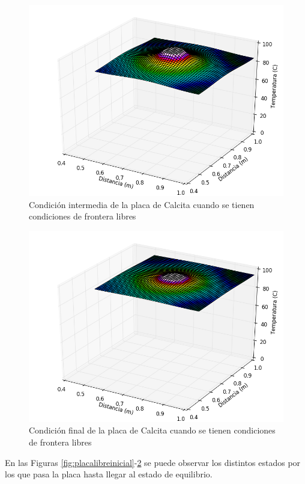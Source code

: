 \documentclass[]{article}
\begin{document}
\begin{figure}[H]
    \centering
    \includegraphics[width=\linewidth]{placalibreintermedio2.png}
    \caption{Condición intermedia de la placa de Calcita cuando se tienen condiciones de frontera libres}
    \label{fig:placalibreintermedio2}
\end{figure}

\begin{figure}[H]
    \centering
    \includegraphics[width=\linewidth]{placalibrefinal.png}
    \caption{Condición final de la placa de Calcita cuando se tienen condiciones de frontera libres}
    \label{fig:placalibrefinal}
\end{figure}
En las Figuras \ref{fig:placalibreinicial}-\ref{fig:placalibrefinal} se puede observar los distintos estados por los que pasa la placa hasta llegar al estado de equilibrio.
\end{document}
